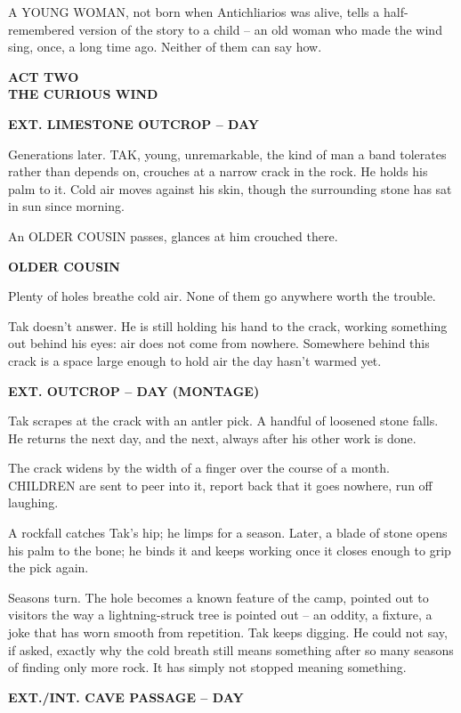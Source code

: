 \documentclass[12pt]{article}
\newcommand{\sceneheading}[1]{%
  \bigskip\noindent\textbf{#1}\par\smallskip
}
\newcommand{\action}[1]{%
  \noindent #1\par\medskip
}
\newcommand{\charcue}[1]{%
  \par\hspace*{2.2in}\textbf{#1}\par
}
\newenvironment{dialogue}{%
  \begin{list}{}{\leftmargin=1.5in\rightmargin=2in\itemsep=0pt\parsep=0pt\topsep=0pt}
  \item[]
}{%
  \end{list}\medskip
}
\newcommand{\actbreak}[1]{%
  \clearpage\thispagestyle{empty}\vspace*{3in}
  \begin{center}{\Large\textbf{#1}}\end{center}
  \clearpage
}
\begin{document}
\action{A YOUNG WOMAN, not born when Antichliarios was alive, tells a half-remembered version of the story to a child -- an old woman who made the wind sing, once, a long time ago. Neither of them can say how.}

\actbreak{ACT TWO\\ \large THE CURIOUS WIND}

\sceneheading{EXT. LIMESTONE OUTCROP -- DAY}

\action{Generations later. TAK, young, unremarkable, the kind of man a band tolerates rather than depends on, crouches at a narrow crack in the rock. He holds his palm to it. Cold air moves against his skin, though the surrounding stone has sat in sun since morning.}

\action{An OLDER COUSIN passes, glances at him crouched there.}

\charcue{OLDER COUSIN}
\begin{dialogue}
Plenty of holes breathe cold air. None of them go anywhere worth the trouble.
\end{dialogue}

\action{Tak doesn't answer. He is still holding his hand to the crack, working something out behind his eyes: air does not come from nowhere. Somewhere behind this crack is a space large enough to hold air the day hasn't warmed yet.}

\sceneheading{EXT. OUTCROP -- DAY (MONTAGE)}

\action{Tak scrapes at the crack with an antler pick. A handful of loosened stone falls. He returns the next day, and the next, always after his other work is done.}

\action{The crack widens by the width of a finger over the course of a month. CHILDREN are sent to peer into it, report back that it goes nowhere, run off laughing.}

\action{A rockfall catches Tak's hip; he limps for a season. Later, a blade of stone opens his palm to the bone; he binds it and keeps working once it closes enough to grip the pick again.}

\action{Seasons turn. The hole becomes a known feature of the camp, pointed out to visitors the way a lightning-struck tree is pointed out -- an oddity, a fixture, a joke that has worn smooth from repetition. Tak keeps digging. He could not say, if asked, exactly why the cold breath still means something after so many seasons of finding only more rock. It has simply not stopped meaning something.}

\sceneheading{EXT./INT. CAVE PASSAGE -- DAY}
\end{document}
